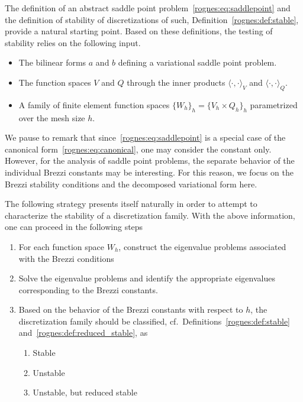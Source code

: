 The definition of an abstract saddle point
problem~\eqref{rognes:eq:saddlepoint} and the definition of stability
of discretizations of such, Definition~\ref{rognes:def:stable},
provide a natural starting point. Based on these definitions, the
testing of stability relies on the following input.
\begin{itemize}
\item The bilinear forms $a$ and $b$ defining a variational
  saddle point problem.
\item The function spaces $V$ and $Q$ through the inner products
  $\langle \cdot, \cdot \rangle_{V}$ and $\langle \cdot, \cdot
  \rangle_{Q}$.
\item A family of finite element function spaces $\{W_h\}_h = \{V_h
  \times Q_h \}_h$ parametrized over the mesh size $h$.
\end{itemize}
We pause to remark that since~\eqref{rognes:eq:saddlepoint} is a special case
of the canonical form~\eqref{rognes:eq:canonical}, one may consider the
\babuska{} constant only. However, for the analysis of saddle point
problems, the separate behavior of the individual Brezzi constants
may be interesting. For this reason, we focus on the Brezzi stability
conditions and the decomposed variational form here.

The following strategy presents itself naturally in order to attempt
to characterize the stability of a discretization family. With the
above information, one can proceed in the following steps
\begin{enumerate}
\item For each function space $W_h$, construct the eigenvalue problems
  associated with the Brezzi conditions
\item Solve the eigenvalue problems and identify the appropriate
  eigenvalues corresponding to the Brezzi constants.
\item Based on the behavior of the Brezzi constants with respect to
  $h$, the discretization family should be classified,
  cf.~Definitions~\ref{rognes:def:stable} and~\ref{rognes:def:reduced_stable}, as
  \begin{enumerate}
  \item Stable
  \item Unstable
  \item Unstable, but reduced stable
  \end{enumerate}
\end{enumerate}


